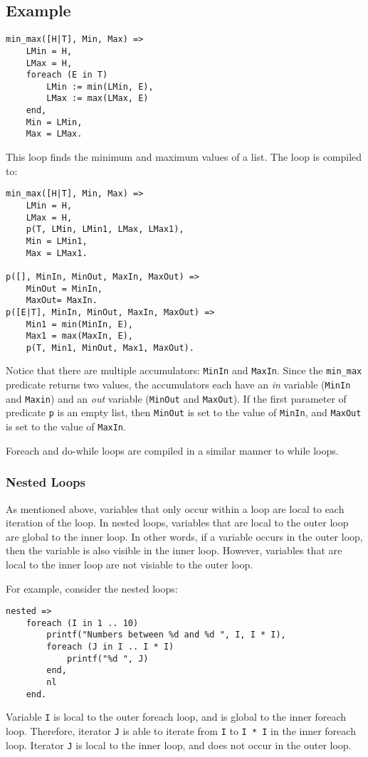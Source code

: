 \subsection*{Example}
\begin{verbatim}
min_max([H|T], Min, Max) =>
    LMin = H,
    LMax = H,
    foreach (E in T)
        LMin := min(LMin, E),
        LMax := max(LMax, E)
    end,
    Min = LMin,
    Max = LMax.
\end{verbatim}

This loop finds the minimum and maximum values of a list.  The loop is compiled to:
\begin{verbatim}
min_max([H|T], Min, Max) =>
    LMin = H,
    LMax = H,
    p(T, LMin, LMin1, LMax, LMax1),
    Min = LMin1,
    Max = LMax1.

p([], MinIn, MinOut, MaxIn, MaxOut) =>
    MinOut = MinIn,
    MaxOut= MaxIn.
p([E|T], MinIn, MinOut, MaxIn, MaxOut) =>
    Min1 = min(MinIn, E),
    Max1 = max(MaxIn, E),
    p(T, Min1, MinOut, Max1, MaxOut).
\end{verbatim}
Notice that there are multiple accumulators: \texttt{MinIn} and \texttt{MaxIn}.  Since the \texttt{min\_max} predicate returns two values, the accumulators each have an \textit{in} variable (\texttt{MinIn} and \texttt{Maxin}) and an \textit{out} variable (\texttt{MinOut} and \texttt{MaxOut}).   If the first parameter of predicate \texttt{p} is an empty list, then \texttt{MinOut} is set to the value of \texttt{MinIn}, and \texttt{MaxOut} is set to the value of \texttt{MaxIn}.

Foreach and do-while loops are compiled in a similar manner to while loops.

\subsubsection{Nested Loops}
As mentioned above, variables that only occur within a loop are local to each iteration of the loop.  In nested loops, variables that are local to the outer loop are global to the inner loop.  In other words, if a variable occurs in the outer loop, then the variable is also visible in the inner loop.  However, variables that are local to the inner loop are not visiable to the outer loop.

For example, consider the nested loops:
\begin{verbatim}
nested =>
    foreach (I in 1 .. 10)
        printf("Numbers between %d and %d ", I, I * I),
        foreach (J in I .. I * I)
            printf("%d ", J)
        end,
        nl
    end.
\end{verbatim}
Variable \texttt{I} is local to the outer foreach loop, and is global to the inner foreach loop.  Therefore, iterator \texttt{J} is able to iterate from \texttt{I} to \texttt{I * I} in the inner foreach loop.  Iterator \texttt{J} is local to the inner loop, and does not occur in the outer loop.

